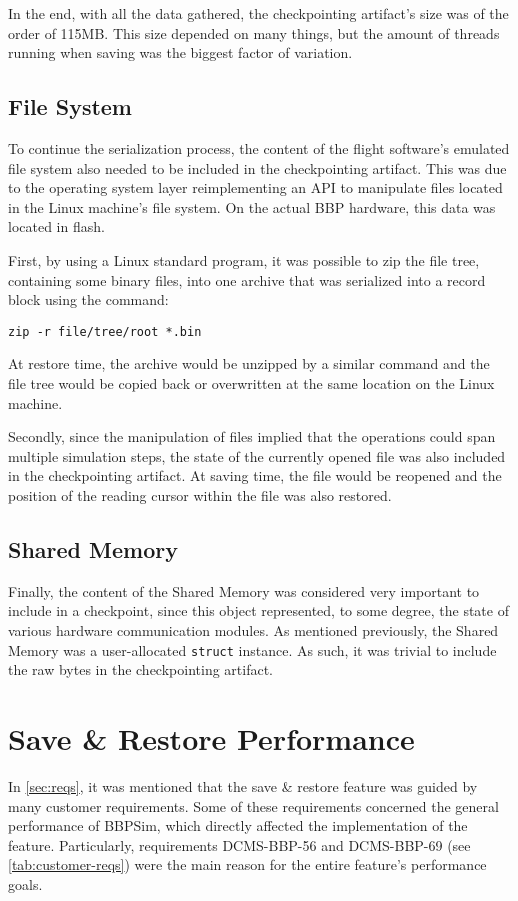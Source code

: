 {In the end, with all the data gathered, the checkpointing artifact's size was of the order of 115MB. This size depended on many things, but the amount of threads running when saving was the biggest factor of variation.

\subsection*{File System}
To continue the serialization process, the content of the flight software's emulated file system also needed to be included in the checkpointing artifact. This was due to the operating system layer reimplementing an API to manipulate files located in the Linux machine's file system. On the actual \gls{BBP} hardware, this data was located in flash.

First, by using a Linux standard program, it was possible to zip the file tree, containing some binary files, into one archive that was serialized into a record block using the command:
\begin{verbatim}
zip -r file/tree/root *.bin
\end{verbatim}
At restore time, the archive would be unzipped by a similar command and the file tree would be copied back or overwritten at the same location on the Linux machine.

Secondly, since the manipulation of files implied that the operations could span multiple simulation steps, the state of the currently opened file was also included in the checkpointing artifact. At saving time, the file would be reopened and the position of the reading cursor within the file was also restored. 

\subsection*{Shared Memory}
Finally, the content of the Shared Memory was considered very important to include in a checkpoint, since this object represented, to some degree, the state of various hardware communication modules. As mentioned previously, the Shared Memory was a user-allocated \texttt{struct} instance. As such, it was trivial to include the raw bytes in the checkpointing artifact.  

\section{Save \& Restore Performance}
In \autoref{sec:reqs}, it was mentioned that the save \& restore feature was guided by many customer requirements. Some of these requirements concerned the general performance of BBPSim, which directly affected the implementation of the feature. Particularly, requirements DCMS-BBP-56 and DCMS-BBP-69 (see \autoref{tab:customer-reqs}) were the main reason for the entire feature's performance goals.

}
